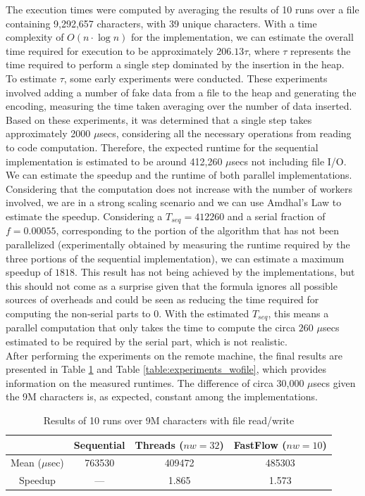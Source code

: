 \documentclass[10pt]{article}
\begin{document}
The execution times were computed by averaging the results of 10 runs over a file containing 9,292,657 characters, with 39 unique characters. With a time complexity of $O(n\cdot\log n)$ for the implementation, we can estimate the overall time required for execution to be approximately $206.13\tau$, where $\tau$ represents the time required to perform a single step dominated by the insertion in the heap.\\
To estimate $\tau$, some early experiments were conducted. These experiments involved adding a number of fake data from a file to the heap and generating the encoding, measuring the time taken averaging over the number of data inserted. Based on these experiments, it was determined that a single step takes approximately 2000 $\mu$secs, considering all the necessary operations from reading to code computation. Therefore, the expected runtime for the sequential implementation is estimated to be around 412,260 $\mu$secs not including file I/O.\\
We can estimate the speedup and the runtime of both parallel implementations. Considering that the computation does not increase with the number of workers involved, we are in a strong scaling scenario and we can use Amdhal's Law to estimate the speedup. Considering a $T_{seq}= 412260$ and a serial fraction of $f = 0.00055$, corresponding to the portion of the algorithm that has not been parallelized (experimentally obtained by measuring the runtime required by the three portions of the sequential implementation), we can estimate a maximum speedup of $1818$. This result has not being achieved by the implementations, but this should not come as a surprise given that the formula ignores all possible sources of overheads and could be seen as reducing the time required for computing the non-serial parts to 0. With the estimated $T_{seq}$, this means a parallel computation that only takes the time to compute the circa $260$ $\mu$secs estimated to be required by the serial part, which is not realistic.\\
After performing the experiments on the remote machine, the final results are presented in Table \ref{table:experiments_wfile} and Table \ref{table:experiments_wofile}, which provides information on the measured runtimes. The difference of circa 30,000 $\mu$secs given the 9M characters is, as expected, constant among the implementations.
\begin{table}[H]
\begin{center}
	\begin{tabular}{c || c | c | c}
	& Sequential & Threads ($nw = 32$) & FastFlow ($nw = 10$)\\
	\hline
	Mean ($\mu$sec) & 763530 & 409472 & 485303 \\
	\hline
	Speedup & --- & 1.865 & 1.573
	\end{tabular}
\end{center}
\caption{Results of 10 runs over 9M characters with file read/write}
\label{table:experiments_wfile}
\end{table}
\end{document}

